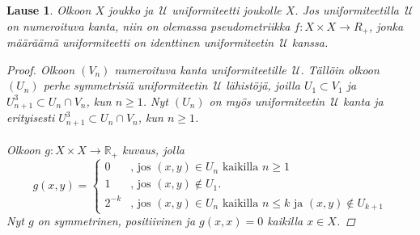 \documentclass[12pt,a4paper,leqno]{report}
\newcommand{\R}{\mathbb{R}}
\newcommand{\U}{\,\mathcal{U}}
\theoremstyle{plain}
\newtheorem{lause}[equation]{Lause}
\theoremstyle{definition}
\theoremstyle{remark}
\begin{document}
\begin{lause}
Olkoon $X$ joukko ja $\U$ uniformiteetti joukolle $X$. 
Jos uniformiteetilla $\U$ on numeroituva kanta, 
niin on olemassa pseudometriikka $f\colon X\times X\rightarrow R_+$, 
jonka määräämä uniformiteetti on identtinen uniformiteetin $\U$ kanssa.
\begin{proof}
Olkoon $(V_n)$ numeroituva kanta uniformiteetille $\U$. 
Tällöin olkoon $(U_n)$ perhe symmetrisiä uniformiteetin $\U$ lähistöjä, 
joilla $U_1\subset V_1$ ja $U_{n+1}^3\subset U_n\cap V_n$, kun $n\geq 1$. 
Nyt $(U_n)$ on myös uniformiteetin $\U$ kanta ja erityisesti 
$U_{n+1}^3\subset U_n\cap V_n$, kun $n\geq 1$. \\
\\
Olkoon $g\colon X\times X\rightarrow \R_+$ kuvaus, jolla 
\begin{equation*}
g(x,y)=
\begin{cases}
0&\text{, jos }(x,y)\in U_n\text{ kaikilla }n\geq 1 \\
1&\text{, jos }(x,y)\not\in U_1. \\
2^{-k}&\text{, jos }(x,y)\in U_n\text{ kaikilla }n\leq k 
\text{ ja } (x,y)\not\in U_{k+1}
\end{cases}
\end{equation*}
Nyt $g$ on symmetrinen, positiivinen ja $g(x,x)=0$ kaikilla $x\in X$. 


\end{proof}
\end{lause}
\end{document}

